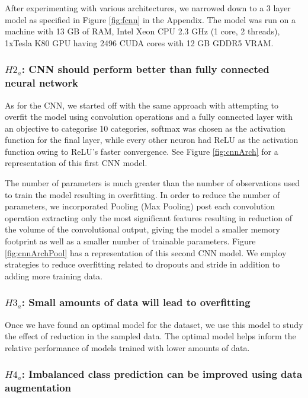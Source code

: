 \documentclass[11pt]{article}
\begin{document}
After experimenting with various architectures, we narrowed down to a 3 layer
model as specified in Figure \ref{fig:fcnn} in the Appendix. The model was
run on a machine with 13 GB of RAM, Intel Xeon CPU 2.3 GHz (1 core, 2
threads), 1xTesla K80 GPU having 2496 CUDA cores with 12 GB GDDR5 VRAM.

\subsubsection{$H2_a$: CNN should perform better than fully connected neural
  network}

As for the CNN, we started off with the same approach with attempting
to overfit the model using convolution operations and a fully connected
layer with an objective to categorise 10 categories, softmax was chosen
as the activation function for the final layer, while every other neuron
had ReLU as the activation function owing to ReLU’s faster convergence. See
Figure \ref{fig:cnnArch} for a representation of this first CNN model.

The number of parameters is much greater than the number of observations
used to train the model resulting in overfitting. In order to reduce the
number of parameters, we incorporated Pooling (Max Pooling) post each
convolution operation extracting only the most significant features
resulting in reduction of the volume of the convolutional output, giving
the model a smaller memory footprint as well as a smaller number of
trainable parameters. Figure \ref{fig:cnnArchPool} has a representation of this
second CNN model. We employ strategies to reduce overfitting related to
dropouts and stride in addition to adding more training data.

\subsubsection{$H3_a$: Small amounts of data will lead to overfitting}

Once we have found an optimal model for the dataset, we use this model
to study the effect of reduction in the sampled data. The optimal model
helps inform the relative performance of models trained with lower amounts
of data.

\subsubsection{$H4_a$: Imbalanced class prediction can be improved using data
  augmentation}
\end{document}
